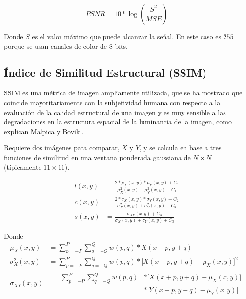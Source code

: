 \documentclass[pregrado]{tesis-usb} %
\begin{document}
\begin{equation}\label{eq:psnr}
PSNR=10*\log\left(\frac{S^2}{MSE}\right)
\end{equation}

Donde $S$ es el valor máximo que puede alcanzar la señal. En este caso es $255$ porque se usan canales de color de 8 bits.

\subsection{Índice de Similitud Estructural (SSIM)}
SSIM es una métrica de imagen ampliamente utilizada, que se ha mostrado que coincide mayoritariamente con la subjetividad humana con respecto a la evaluación de la calidad estructural de una imagen y es muy sensible a las degradaciones en la estructura espacial de la luminancia de la imagen, como explican Malpica y Bovik \cite{Malpica2009}. 

Requiere dos imágenes para comparar, $X$ y $Y$, y se calcula en base a tres funciones de similitud en una ventana ponderada gaussiana de $N\times N$ (típicamente $11\times 11$).

\begin{equation}\label{eq:ssim_components}
\begin{split}
l(x,y) & = \frac{2*\mu_X(x,y)*\mu_Y(x,y)+C_1}{\mu_X^2(x,y)+\mu_Y^2(x,y)+C_1} \\ 
c(x,y) & = \frac{2*\sigma_X(x,y)*\sigma_Y(x,y)+C_2}{\sigma_X^2(x,y)+\sigma_Y^2(x,y)+C_2} \\ 
s(x,y) & = \frac{\sigma_{XY}(x,y)+C_3}{\sigma_X(x,y)+\sigma_Y(x,y)+C_3}
\end{split}
\end{equation}

Donde
\begin{equation*}
\begin{split}
\mu_X(x,y) & = \sum\limits_{p=-P}^{P} \sum\limits_{q=-Q}^{Q} w(p,q)*X(x+p,y+q)\\ 
\sigma_X^2(x,y) & = \sum\limits_{p=-P}^{P} \sum\limits_{q=-Q}^{Q} w(p,q)*\lbrack X(x+p,y+q)-\mu_X(x,y) \rbrack^2\\ 
\sigma_{XY}(x,y) & = \begin{split}\sum\limits_{p=-P}^{P} \sum\limits_{q=-Q}^{Q} w(p,q)& *\lbrack X(x+p,y+q)-\mu_X(x,y)\rbrack \\ & *\lbrack Y(x+p,y+q)-\mu_Y(x,y)\rbrack\end{split}
\end{split}
\end{equation*}
\end{document}
